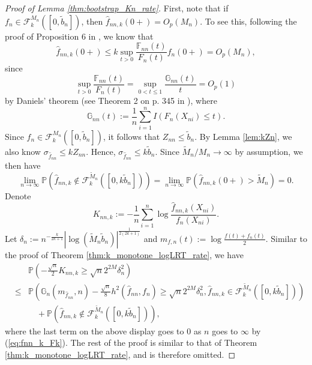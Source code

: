 \documentclass[12pt,letterpaper, twoside, openany]{article}
\theoremstyle{plain}
\begin{document}
\begin{proof}[Proof of Lemma \ref{thm:bootstrap_Kn_rate}]
First, note that if $f_n \in \mathcal{F}_k^{M_n}([0, \tilde{b}_n])$, then $\hat{f}_{nn,k}(0+) = O_p(M_n)$. To see this, following the proof of Proposition 6 in \cite{gao2009rate}, we know that
\begin{equation*}
	\hat{f}_{nn,k}(0+) \leq k \sup_{t > 0} \frac{ \mathbb{F}_{nn}(t)}{F_n(t)} f_n(0+) = O_{p}(M_n),
\end{equation*}
since
\begin{equation*}
	\sup_{t > 0} \frac{ \mathbb{F}_{nn}(t)}{F_n(t)} = \sup_{ 0 < t \leq 1} \frac{\mathbb{G}_{nn}(t)}{t} = O_{p}(1)
\end{equation*}
by Daniels' theorem (see Theorem 2 on p. 345 in \cite{Shorack1986empirical}), where 
\begin{equation*}
	\mathbb{G}_{nn}(t) := \frac{1}{n} \sum^n_{i=1}I(F_n(X_{ni}) \leq t).
\end{equation*}
Since $f_n \in \mathcal{F}_k^{M_n}([0, \tilde{b}_n])$, it follows that $Z_{nn} \leq \tilde{b}_n$. By Lemma \ref{lem:kZn}, we also know $\sigma_{\hat{f}_{nn}} \leq k Z_{nn}$. Hence, $\sigma_{\hat{f}_{nn}} \leq k \tilde{b}_n$. Since $\widetilde{M}_n / M_n \rightarrow \infty$ by assumption, we then have
\begin{equation}\label{eq:fnn_k_Fk}
	\lim_{n \rightarrow \infty} \mathbb{P}(\hat{f}_{nn, k} \notin \mathcal{F}^{\widetilde{M}_n}_k([0, k \tilde{b}_n]) ) = \lim_{n \rightarrow \infty}\mathbb{P}(\hat{f}_{nn,k}(0+) > \widetilde{M}_n) = 0.
\end{equation}
Denote
\begin{equation*}
	K_{nn, k} := - \frac{1}{n} \sum^n_{i=1} \log \frac{\hat{f}_{nn,k}(X_{ni})}{f_n(X_{ni})}.
\end{equation*}
Let $\delta_n := n^{-\frac{k}{2k+1}}|\log( \tilde{M}_n \tilde{b}_n)|^{ \frac{1}{2(2k+1)}}$ and $m_{f,n}(t) := \log \frac{f(t) + f_n(t)}{2}$. Similar to the proof of Theorem \ref{thm:k_monotone_logLRT_rate}, we have
\begin{eqnarray*}
	&& 	\mathbb{P} \left(  - \frac{\sqrt{n}}{2} K_{nn, k} \geq \sqrt{n} 2^{2M} \delta^2_n \right) \\
	&\leq & \mathbb{P} \left( \mathbb{G}_n(m_{\hat{f}_{nn}}, n) - \frac{\sqrt{n}}{8} h^2 ( \hat{f}_{nn}, f_n ) \geq \sqrt{n} 2^{2M} \delta^2_n, \hat{f}_{nn,k} \in  \mathcal{F}^{\widetilde{M}_n}_k([0, k \tilde{b}_n]) \right)  \\
	&& \quad + \mathbb{P}(\hat{f}_{nn,k} \notin \mathcal{F}^{\widetilde{M}_n}_k([0, k \tilde{b}_n])),
\end{eqnarray*}
where the last term on the above display goes to $0$ as $n$ goes to $\infty$ by (\ref{eq:fnn_k_Fk}).
The rest of the proof is similar to that of Theorem \ref{thm:k_monotone_logLRT_rate}, and is therefore omitted.
\end{proof}
\end{document}
